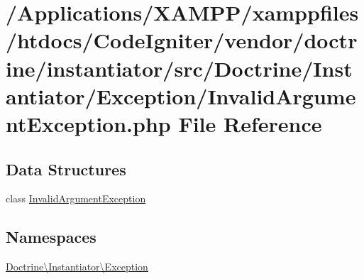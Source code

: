 \hypertarget{doctrine_2instantiator_2src_2_doctrine_2_instantiator_2_exception_2_invalid_argument_exception_8php}{}\section{/\+Applications/\+X\+A\+M\+P\+P/xamppfiles/htdocs/\+Code\+Igniter/vendor/doctrine/instantiator/src/\+Doctrine/\+Instantiator/\+Exception/\+Invalid\+Argument\+Exception.php File Reference}
\label{doctrine_2instantiator_2src_2_doctrine_2_instantiator_2_exception_2_invalid_argument_exception_8php}
\subsection*{Data Structures}
\begin{DoxyCompactItemize}
\item 
class \mbox{\hyperlink{class_doctrine_1_1_instantiator_1_1_exception_1_1_invalid_argument_exception}{Invalid\+Argument\+Exception}}
\end{DoxyCompactItemize}
\subsection*{Namespaces}
\begin{DoxyCompactItemize}
\item 
 \mbox{\hyperlink{namespace_doctrine_1_1_instantiator_1_1_exception}{Doctrine\textbackslash{}\+Instantiator\textbackslash{}\+Exception}}
\end{DoxyCompactItemize}
